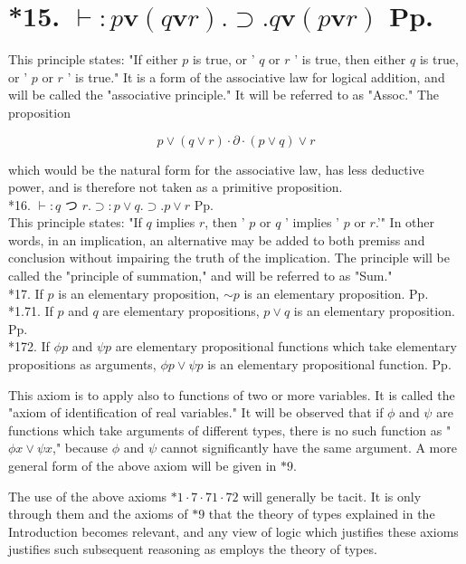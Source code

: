 \documentclass[10pt]{article}
\begin{document}
\section*{*15. $\vdash: p \mathbf{v}(q \mathbf{v} r) . \supset . q \mathbf{v}(p \mathbf{v} r)$ Pp.}
This principle states: "If either $p$ is true, or ' $q$ or $r$ ' is true, then either $q$ is true, or ' $p$ or $r$ ' is true." It is a form of the associative law for logical addition, and will be called the "associative principle." It will be referred to as "Assoc." The proposition

$$
p \vee(q \vee r) \cdot \partial \cdot(p \vee q) \vee r
$$

which would be the natural form for the associative law, has less deductive power, and is therefore not taken as a primitive proposition.\\
*16. $\vdash: q$ つ $r . \supset: p \vee q . \supset . p \vee r$ Pp.\\
This principle states: "If $q$ implies $r$, then ' $p$ or $q$ ' implies ' $p$ or $r$.'" In other words, in an implication, an alternative may be added to both premiss and conclusion without impairing the truth of the implication. The principle will be called the "principle of summation," and will be referred to as "Sum."\\
*17. If $p$ is an elementary proposition, $\sim p$ is an elementary proposition. Pp. *1.71. If $p$ and $q$ are elementary propositions, $p \vee q$ is an elementary proposition. Pp.\\
*172. If $\phi p$ and $\psi p$ are elementary propositional functions which take elementary propositions as arguments, $\phi p \vee \psi p$ is an elementary propositional function. Pp.

This axiom is to apply also to functions of two or more variables. It is called the "axiom of identification of real variables." It will be observed that if $\phi$ and $\psi$ are functions which take arguments of different types, there is no such function as " $\phi x \vee \psi x$," because $\phi$ and $\psi$ cannot significantly have the same argument. A more general form of the above axiom will be given in $* 9$.

The use of the above axioms $* 1 \cdot 7 \cdot 71 \cdot 72$ will generally be tacit. It is only through them and the axioms of $* 9$ that the theory of types explained in the Introduction becomes relevant, and any view of logic which justifies these axioms justifies such subsequent reasoning as employs the theory of types.
\end{document}
